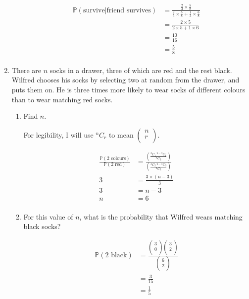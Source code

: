 \documentclass[10pt,\jkfside,a4paper]{article}
\begin{document}
\begin{enumerate}
\begin{enumerate}
\[
\begin{split}
\mathbb{P}(\text{survive}|\text{friend survives}) &= \frac{\frac{2}{3} \times \frac{5}{8}}{\frac{2}{3} \times
\frac{5}{8} +
\frac{1}{3} \times \frac{6}{8}} \\
                                  &= \frac{2 \times 5}{2 \times 5 + 1 \times 6} \\
                                  &= \frac{10}{16} \\
                                  &= \frac{5}{8} \\
\end{split}
\]

\end{enumerate}

\item
There are $n$ socks in a drawer, three of which are red and the rest black.
Wilfred chooses his socks by selecting two at random from the drawer, and puts
them on.
He is three times more likely to wear socks of different colours than to wear
matching red socks.

\begin{enumerate}

\item Find $n$.

For legibility, I will use $^n C_r$ to mean
$\begin{pmatrix} n \\ r
\\
\end{pmatrix}$.

\[
\begin{split}
\frac{\mathbb{P}(2\text{ colours})}{\mathbb{P}(2\text{ red})} &= \frac{\left(\frac{^3 C_1 \ ^{n - 3} C_1}{^n
C_2}\right)}{\left(\frac{^3
C_2 \ ^{n - 3} C_0}{^n C_2}\right)} \\
3 &= \frac{3 \times (n - 3)}{3} \\
3 &= n - 3 \\
n &= 6 \\
\end{split}
\]

\item For this value of $n$, what is the probability that Wilfred wears matching
black socks?

\[
\begin{split}
\mathbb{P}(2\text{ black}) &= \frac{\begin{pmatrix} 3 \\ 0 \\ \end{pmatrix} \begin{pmatrix} 3 \\ 2 \\ \end{pmatrix}}{\begin{pmatrix} 6 \\ 2 \\ \end{pmatrix}} \\
                  &= \frac{3}{15} \\
                  &= \frac{1}{5} \\
\end{split}
\]


\end{enumerate}
\end{enumerate}
\end{document}
